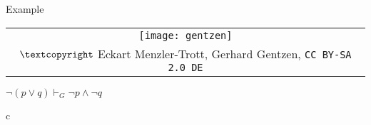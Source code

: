\documentclass[../slides.tex]{subfiles}
\begin{document}
\begin{frame}{Example}

\begin{center}
		\begin{tabular}{c}
		\texttt{[image: gentzen]}\\[-1ex]
		{\tiny $\textcopyright$ Eckart Menzler-Trott, Gerhard Gentzen, \texttt{CC BY-SA 2.0 DE}}
		\end{tabular}
		\vspace{2ex}
		
		$\neg(p\lor q)\vdash_G \neg p\land \neg q$
		\end{center}
		
		
\begin{center}
		\begin{tabular}{c}
		\end{tabular}
	\end{center}
\end{frame}
\end{document}
